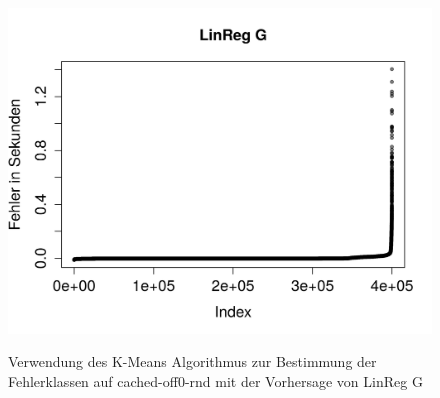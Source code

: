 \documentclass[
	12pt,
	a4paper,
	BCOR10mm,
	DIV14,
	listof=totoc,
	bibliography=totoc,
	headsepline
]{scrreprt}
\begin{document}
\begin{figure}
{		\includegraphics[width=.43\textwidth]{Bilder/Plots/error_class/exploration/linreg_error_sorted_rnd.png}
	} 	
	\\
	\caption{Verwendung des K-Means Algorithmus zur Bestimmung der Fehlerklassen auf cached-off0-rnd mit der Vorhersage von \glqq LinReg G\grqq}
	\label{fig:error_class_clustering_rnd}
\end{figure} 
\end{document}
